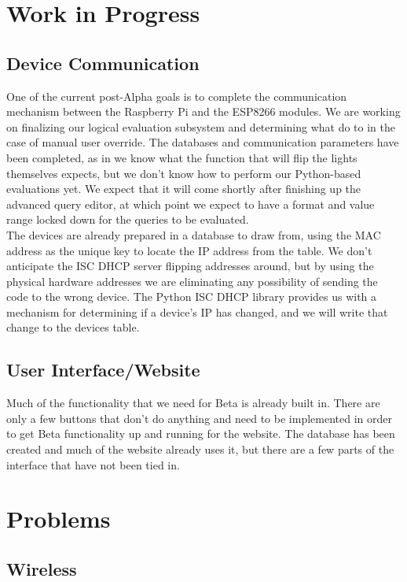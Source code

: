 \documentclass[oneside,openright]{book}
\begin{document}
\section{Work in Progress}

\subsection{Device Communication}

One of the current post-Alpha goals is to complete the communication mechanism
between the Raspberry Pi and the ESP8266 modules. We are working on finalizing
our logical evaluation subsystem and determining what do to in the case of
manual user override. The databases and communication parameters have been
completed, as in we know what the function that will flip the lights themselves
expects, but we don't know how to perform our Python-based evaluations yet. We
expect that it will come shortly after finishing up the advanced query editor,
at which point we expect to have a format and value range locked down for the
queries to be evaluated.\\

The devices are already prepared in a database to draw from, using the MAC
address as the unique key to locate the IP address from the table. We don't
anticipate the ISC DHCP server flipping addresses around, but by using the
physical hardware addresses we are eliminating any possibility of sending the
code to the wrong device. The Python ISC DHCP library provides us with a
mechanism for determining if a device's IP has changed, and we will write that
change to the devices table.

\subsection{User Interface/Website}

Much of the functionality that we need for Beta is already built in. There are
only a few buttons that don't do anything and need to be implemented in order
to get Beta functionality up and running for the website. The database has been
created and much of the website already uses it, but there are a few parts of
the interface that have not been tied in.

\section{Problems}

\subsection{Wireless}
\end{document}
